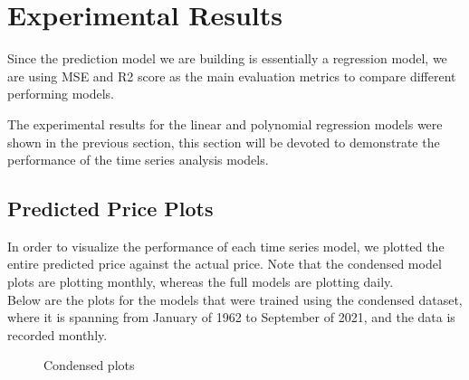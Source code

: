 \documentclass{article}
\begin{document}
\section{Experimental Results} 

Since the prediction model we are building is essentially a regression model, we are using MSE and R2 score as the main evaluation metrics to compare different performing models. 

The experimental results for the linear and polynomial regression models were shown in the previous section, this section will be devoted to demonstrate the performance of the time series analysis models.

\subsection{Predicted Price Plots}

In order to visualize the performance of each time series model, we plotted the entire predicted price against the actual price. Note that the condensed model plots are plotting monthly, whereas the full models are plotting daily.\\

Below are the plots for the models that were trained using the condensed dataset, where it is spanning from January of 1962 to September of 2021, and the data is recorded monthly.

\begin{figure}[H]
    \qquad
    \caption{Condensed plots}
    \label{fig:example}
\end{figure}
\end{document}
